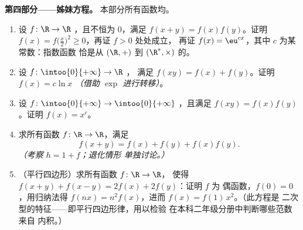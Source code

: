 \begin{problem}[{周末问题——$f(x + y) = f(x) + f(y)$：
正则性导出线性，以及“怪物”的画像}]
\medskip
\noindent\textbf{第四部分——姊妹方程。}
本部分所有函数均。
\begin{enumerate}[resume]
  \item 设 $f \colon \R \to \R$ ，且不恒为
        $0$，满足 $f(x + y) = f(x)f(y)$。证明 $f(x) =
        f\bigl(\frac x2\bigr)^2 \geq 0$，再证 $f > 0$ 处处成立，
        再证 $f(x) = \eu^{cx}$，其中 $c$ 为某常数：指数函数
        恰是从 $(\R, +)$ 到
        $(\R^*, \times)$ 的。
  \item 设 $f \colon \intoo{0}{+\infty} \to \R$ ，
        满足 $f(xy) = f(x) + f(y)$。证明 $f(x) = c\ln x$
        \emph{（借助 $\exp$ 进行转移）}。
  \item 设 $f \colon \intoo{0}{+\infty} \to \intoo{0}{+\infty}$
        ，且满足 $f(xy) = f(x)f(y)$。证明 $f(x) = x^c$。
  \item 求所有函数 $f \colon \R \to \R$，满足
        \[
        f(x + y) = f(x) + f(y) + f(x)f(y) .
        \]
        \emph{（考察 $h = 1 + f$；退化情形
        单独讨论。）}
  \item （平行四边形）求所有函数 $f \colon \R \to \R$，
        使得 $f(x + y) + f(x - y) = 2f(x) + 2f(y)$：证明 $f$ 为
        偶函数，$f(0) = 0$，用归纳法得 $f(nx) = n^2 f(x)$，进而
        $f(x) = f(1)\,x^2$。（此方程是
        二次型的特征——即平行四边形律，用以检验
        在本科二年级分册中判断哪些范数来自
        内积。）
\end{enumerate}


\end{problem}
